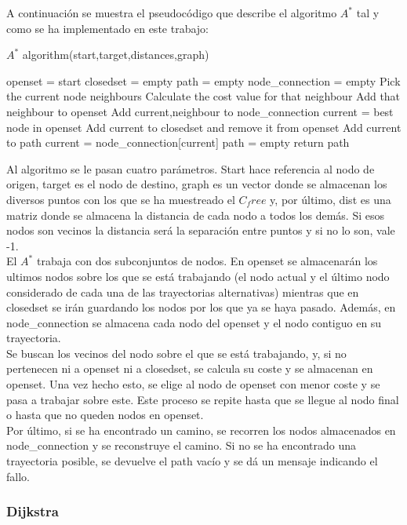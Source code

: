 A continuación se muestra el pseudocódigo que describe el algoritmo $A^*$ tal y como se ha implementado en este trabajo:\\

\begin{algorithm}
\caption{$A^*$ algorithm(start,target,distances,graph)}\label{A_algorithm}
\begin{algorithmic}[1]
\State openset = start
\State closedset = empty
\State path = empty
\State node_connection = empty
 \State Pick the current node neighbours
 \State Calculate the cost value for that neighbour
 \State Add that neighbour to openset
 \State Add current,neighbour to node_connection
\EndFor
\State current = best node in openset
\State Add current to closedset and remove it from openset
\EndWhile
{}
\State Add current to path
\State current = node_connection[current]
\EndWhile
\Else
\State path = empty
\EndIf
\State return path
\end{algorithmic}
\end{algorithm}  

Al algoritmo se le pasan cuatro parámetros. Start hace referencia al nodo de origen, target es el nodo de destino, graph es un vector donde se almacenan los diversos puntos con los que se ha muestreado el $C_free$ y, por último, dist es una matriz donde se almacena la distancia de cada nodo a todos los demás. Si esos nodos son vecinos la distancia será la separación entre puntos y si no lo son, vale -1.\\

El $A^*$ trabaja con dos subconjuntos de nodos. En openset se almacenarán los ultimos nodos sobre los que se está trabajando (el nodo actual y el último nodo considerado de cada una de las trayectorias alternativas) mientras que en closedset se irán guardando los nodos por los que ya se haya pasado. Además, en node_connection se almacena cada nodo del openset y el nodo contiguo en su trayectoria.\\

Se buscan los vecinos del nodo sobre el que se está trabajando, y, si no pertenecen ni a openset ni a closedset, se calcula su coste y se almacenan en openset. Una vez hecho esto, se elige al nodo de openset con menor coste y se pasa a trabajar sobre este. Este proceso se repite hasta que se llegue al nodo final o hasta que no queden nodos en openset.\\

Por último, si se ha encontrado un camino, se recorren los nodos almacenados en node_connection y se reconstruye el camino. Si no se ha encontrado una trayectoria posible, se devuelve el path vacío y se dá un mensaje indicando el fallo.\\

\subsubsection{Dijkstra}